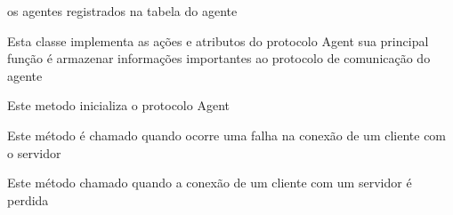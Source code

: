 \documentclass[letterpaper,10pt,brazil]{sphinxmanual}
\begin{document}
\begin{fulllineitems}
\begin{fulllineitems}
\begin{quote}
\begin{description}
\end{description}\end{quote}

os agentes registrados na tabela do agente

\end{fulllineitems}


\end{fulllineitems}


\begin{fulllineitems}
\label{api:pade.core.agent.AgentFactory}
Esta classe implementa as ações e atributos do
protocolo Agent sua principal função é armazenar
informações importantes ao protocolo de comunicação
do agente

\begin{fulllineitems}
\label{api:pade.core.agent.AgentFactory.buildProtocol}
Este metodo inicializa o protocolo Agent

\end{fulllineitems}


\begin{fulllineitems}
\label{api:pade.core.agent.AgentFactory.clientConnectionFailed}
Este método é chamado quando ocorre uma
falha na conexão de um cliente com o servidor

\end{fulllineitems}


\begin{fulllineitems}
\label{api:pade.core.agent.AgentFactory.clientConnectionLost}
Este método chamado quando a conexão de
um cliente com um servidor é perdida

\end{fulllineitems}


\end{fulllineitems}
\end{document}
